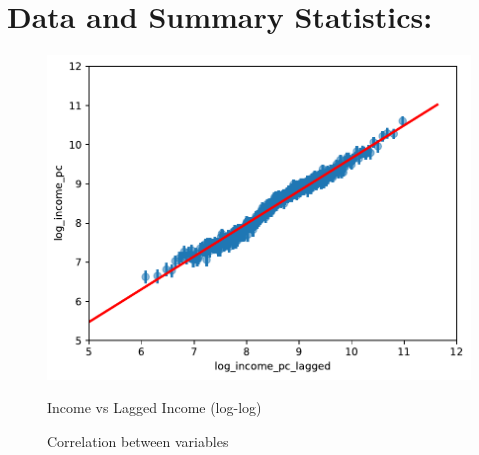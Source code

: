 \section{Data and Summary Statistics:}

\begin{figure}[H]
    \centering
    \caption{Income vs Lagged Income (log-log)}
    \includegraphics{../figures/income_vs_lagged_income_log_log_scatterplot.pdf}
    \label{fig:enter-label}
\end{figure}


\begin{figure}[H]
    \centering
    \caption{Correlation between variables}
    \label{fig:enter-label}
\end{figure}


